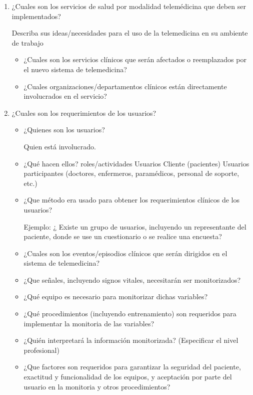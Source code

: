 \begin{enumerate}
\item ¿Cuales son los servicios de salud por modalidad telemédicina que deben ser implementados?

Describa sus ideas/necesidades para el uso de la telemedicina en su ambiente de trabajo 
\begin{itemize}
\item ¿Cuales son los servicios clínicos que serán afectados o reemplazados por el nuevo sistema de telemedicina?
\item ¿Cuales organizaciones/departamentos clínicos están directamente involucrados en el servicio? 
\end{itemize}

\item ¿Cuales son los requerimientos de los usuarios?
\begin{itemize}
\item  ¿Quienes son los usuarios? 

Quien está involucrado.

\item ¿Qué hacen ellos?
roles/actividades 
Usuarios Cliente (pacientes) 
Usuarios participantes (doctores, enfermeros, paramédicos,  personal de soporte, etc.) 

\item  ¿Que método era usado para obtener los requerimientos clínicos de los usuarios? 

Ejemplo: ¿ Existe un grupo de usuarios, incluyendo un representante del paciente, donde se use un cuestionario o se realice una encuesta?

\item ¿Cuales son los eventos/episodios clínicos que serán dirigidos en el sistema de telemedicina? 

\item ¿Que señales, incluyendo signos vitales, necesitarán ser monitorizados? 

\item ¿Qué equipo es necesario para monitorizar dichas variables? 

\item ¿Qué procedimientos (incluyendo entrenamiento) son requeridos para implementar la monitoria de las variables? 

\item ¿Quién interpretará la información monitorizada? (Especificar el nivel profesional) 

\item ¿Que factores son requeridos para garantizar la seguridad del paciente, exactitud y funcionalidad de los equipos, y aceptación por parte del usuario en la monitoria y otros procedimientos?


\end{itemize}
\end{enumerate}
